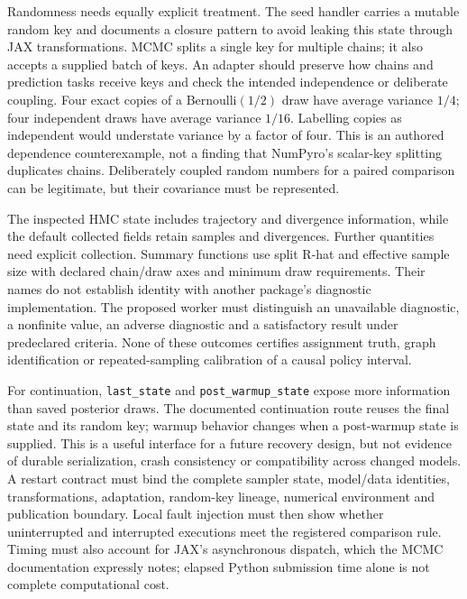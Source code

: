 Randomness needs equally explicit treatment. The seed handler carries a mutable random key and documents a closure pattern to avoid leaking this state through JAX transformations. MCMC splits a single key for multiple chains; it also accepts a supplied batch of keys. An adapter should preserve how chains and prediction tasks receive keys and check the intended independence or deliberate coupling. Four exact copies of a Bernoulli$(1/2)$ draw have average variance $1/4$; four independent draws have average variance $1/16$. Labelling copies as independent would understate variance by a factor of four. This is an authored dependence counterexample, not a finding that NumPyro's scalar-key splitting duplicates chains. Deliberately coupled random numbers for a paired comparison can be legitimate, but their covariance must be represented. \citep{exec23_numpyro_sources,exec23_numpyro_reference}

The inspected HMC state includes trajectory and divergence information, while the default collected fields retain samples and divergences. Further quantities need explicit collection. Summary functions use split R-hat and effective sample size with declared chain/draw axes and minimum draw requirements. Their names do not establish identity with another package's diagnostic implementation. The proposed worker must distinguish an unavailable diagnostic, a nonfinite value, an adverse diagnostic and a satisfactory result under predeclared criteria. None of these outcomes certifies assignment truth, graph identification or repeated-sampling calibration of a causal policy interval. \citep{exec23_numpyro_sources}

For continuation, \texttt{last\_state} and \texttt{post\_warmup\_state} expose more information than saved posterior draws. The documented continuation route reuses the final state and its random key; warmup behavior changes when a post-warmup state is supplied. This is a useful interface for a future recovery design, but not evidence of durable serialization, crash consistency or compatibility across changed models. A restart contract must bind the complete sampler state, model/data identities, transformations, adaptation, random-key lineage, numerical environment and publication boundary. Local fault injection must then show whether uninterrupted and interrupted executions meet the registered comparison rule. Timing must also account for JAX's asynchronous dispatch, which the MCMC documentation expressly notes; elapsed Python submission time alone is not complete computational cost. \citep{exec23_numpyro_sources}

